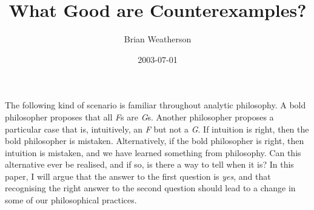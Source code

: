 \documentclass[
  11pt,
  letterpaper,
  DIV=11,
  numbers=noendperiod,
  oneside]{scrartcl}
\title{What Good are Counterexamples?}
\author{Brian Weatherson}
\date{2003-07-01}
\begin{document}
\maketitle
The following kind of scenario is familiar throughout analytic
philosophy. A bold philosopher proposes that all \emph{F}s are
\emph{G}s. Another philosopher proposes a particular case that is,
intuitively, an \emph{F} but not a \emph{G}. If intuition is right, then
the bold philosopher is mistaken. Alternatively, if the bold philosopher
is right, then intuition is mistaken, and we have learned something from
philosophy. Can this alternative ever be realised, and if so, is there a
way to tell when it is? In this paper, I will argue that the answer to
the first question is \emph{yes}, and that recognising the right answer
to the second question should lead to a change in some of our
philosophical practices.

\end{document}
